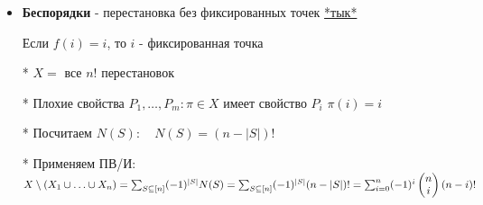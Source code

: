 \documentclass[12pt]{article}
\begin{document}
\begin{itemize}
        \item \textbf{Беспорядки} - перестановка без фиксированных точек
        \hfill\href{https://ru.wikipedia.org/wiki/%D0%91%D0%B5%D1%81%D0%BF%D0%BE%D1%80%D1%8F%D0%B4%D0%BE%D0%BA_(%D0%BF%D0%B5%D1%80%D0%B5%D1%81%D1%82%D0%B0%D0%BD%D0%BE%D0%B2%D0%BA%D0%B0)}{*тык*}

        Если $f(i) = i$, то $i$ - фиксированная точка

        * $X = $ все $n!$ перестановок

        * Плохие свойства $P_1,\dots,P_m : \pi \in X$ имеет свойство $P_i$ \Longleftrightarrow $\pi(i) = i$

        * Посчитаем $N(S): \quad N(S) = (n - |S|)!$

        * Применяем ПВ/И: $X \setminus (X_1 \union \dots \union X_n) = \sum_{S \subseteq [n]} (-1)^{|S|} N(S) =
        \sum_{S \subseteq [n]} (-1)^{|S|} (n - |S|)! = \sum_{i = 0}^n (-1)^{i} \begin{pmatrix}
                                                                                   n \\ i
        \end{pmatrix} (n - i)!$

    \end{itemize}
\end{document}
